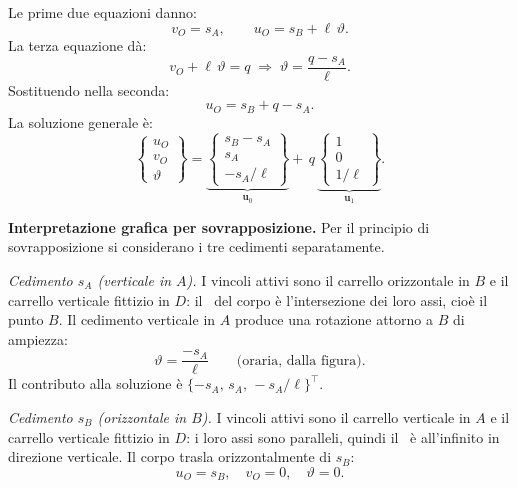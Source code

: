 \begin{esempio}
\begin{svolgimento}
		Le prime due equazioni danno:
		\begin{equation*}
			v_O = s_A, \qquad u_O = s_B + \ell\,\vartheta.
		\end{equation*}
		La terza equazione dà:
		\begin{equation*}
			v_O + \ell\,\vartheta = q
			\;\Longrightarrow\;
			\vartheta = \frac{q - s_A}{\ell}.
		\end{equation*}
		Sostituendo nella seconda:
		\begin{equation*}
			u_O = s_B + q - s_A.
		\end{equation*}
		La soluzione generale è:
		\begin{equation*}\label{eq:labile_L_sol}
			\begin{Bmatrix}
				u_O \\ v_O \\ \vartheta
			\end{Bmatrix}
			=
			\underbrace{
				\begin{Bmatrix}
					s_B - s_A \\ s_A \\ -s_A/\ell
				\end{Bmatrix}
			}_{\bm{u}_0}
			+\, q\,
			\underbrace{
				\begin{Bmatrix}
					1 \\ 0 \\ 1/\ell
				\end{Bmatrix}
			}_{\bm{u}_1}.
		\end{equation*}
		
		\noindent\textbf{Interpretazione grafica per sovrapposizione.}
		Per il principio di sovrapposizione si considerano i
		tre cedimenti separatamente.
		
		\smallskip
		\noindent\textit{Cedimento $s_A$ (verticale in $A$).}
		I vincoli attivi sono il carrello orizzontale in $B$
		e il carrello verticale fittizio in $D$: il \CRa\ del
		corpo è l'intersezione dei loro assi, cioè il punto
		$B$. Il cedimento verticale in $A$ produce una
		rotazione attorno a $B$ di ampiezza:
		\begin{equation*}
			\vartheta = \frac{-s_A}{\ell} \qquad
			\text{(oraria, dalla figura)}.
		\end{equation*}
		Il contributo alla soluzione è
		$\{-s_A,\, s_A,\, -s_A/\ell\}^\top$.
		
		\smallskip
		\noindent\textit{Cedimento $s_B$ (orizzontale in $B$).}
		I vincoli attivi sono il carrello verticale in $A$
		e il carrello verticale fittizio in $D$: i loro assi
		sono paralleli, quindi il \CRa\ è all'infinito in
		direzione verticale. Il corpo trasla orizzontalmente
		di $s_B$:
		\begin{equation*}
			u_O = s_B, \quad v_O = 0, \quad \vartheta = 0.
		\end{equation*}
		

\end{svolgimento}
\end{esempio}
